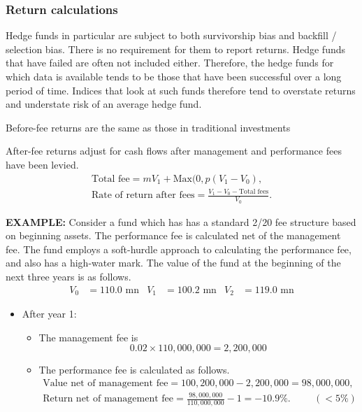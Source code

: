 \documentclass[../notes_compiled.tex]{subfiles}
\begin{document}
\subsubsection{Return calculations}
\begin{itemize}
\item Hedge funds in particular are subject to both survivorship bias and backfill / selection bias. There is no requirement for them to report returns. Hedge funds that have failed are often not included either. Therefore, the hedge funds for which data is available tends to be those that have been successful over a long period of time. Indices that look at such funds therefore tend to overstate returns and understate risk of an average hedge fund.
\item Before-fee returns are the same as those in traditional investments
\item After-fee returns adjust for cash flows after management and performance fees have been levied.
\begin{gather}
\text{Total fee} = mV_{1} + \text{Max}(0, p(V_{1}-V_{0}), \\
\text{Rate of return after fees} = \frac{V_{1}-V_{0}-\text{Total fees}}{V_{0}}.
\end{gather}
{\color{RedViolet}
\item[] \textbf{EXAMPLE:} Consider a fund which has has a standard 2/20 fee structure based on beginning assets. The performance fee is calculated net of the management fee. The fund employs a soft-hurdle approach to calculating the performance fee, and also has a high-water mark. The value of the fund at the beginning of the next three years is as follows.
\begin{align*}
V_{0}&=110.0\text{ mn} & V_{1}&=100.2\text{ mn} & V_{2}&=119.0\text{ mn}
\end{align*}
}
{\color{RoyalBlue}
\begin{itemize}
\item After year 1:
\begin{itemize}
\item The management fee is
\begin{equation*}
0.02 \times 110,000,000 = 2,200,000
\end{equation*}
\item The performance fee is calculated as follows.
\begin{gather*}
\text{Value net of management fee} = 100,200,000 - 2,200,000 = 98,000,000, \\
\text{Return net of management fee} = \frac{98,000,000}{110,000,000}-1 = -10.9\%. \hspace{1cm} (<5\%)

\end{gather*}
\end{itemize}
\end{itemize}}
\end{itemize}
\end{document}
